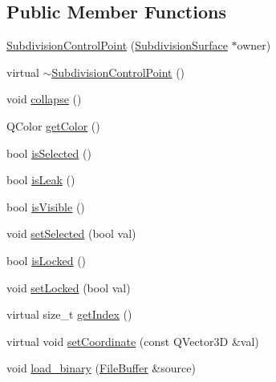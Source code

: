 \subsection*{Public Member Functions}
\begin{DoxyCompactItemize}
\item 
\hyperlink{classShipCADGeometry_1_1SubdivisionControlPoint_a812f4e2343926ef41bc7104f0f7b1dd9}{Subdivision\-Control\-Point} (\hyperlink{classShipCADGeometry_1_1SubdivisionSurface}{Subdivision\-Surface} $\ast$owner)
\item 
virtual \hyperlink{classShipCADGeometry_1_1SubdivisionControlPoint_aed35211e2f60cd5ed1de628d732e4791}{$\sim$\-Subdivision\-Control\-Point} ()
\item 
void \hyperlink{classShipCADGeometry_1_1SubdivisionControlPoint_a3c11cf5f0a22b44cbc8674a5d82942b0}{collapse} ()
\item 
Q\-Color \hyperlink{classShipCADGeometry_1_1SubdivisionControlPoint_ad3af0386e8bb679a2037054ddbdb6a20}{get\-Color} ()
\item 
bool \hyperlink{classShipCADGeometry_1_1SubdivisionControlPoint_af446fc02c7dc2e20383e741f71f4c358}{is\-Selected} ()
\item 
bool \hyperlink{classShipCADGeometry_1_1SubdivisionControlPoint_a1d9150cdde6105519de95a94689faa51}{is\-Leak} ()
\item 
bool \hyperlink{classShipCADGeometry_1_1SubdivisionControlPoint_ad739bf09eb693c8956101d0576736239}{is\-Visible} ()
\item 
void \hyperlink{classShipCADGeometry_1_1SubdivisionControlPoint_a5642f57c7f17e78c27ad6edb0fdb7f65}{set\-Selected} (bool val)
\item 
bool \hyperlink{classShipCADGeometry_1_1SubdivisionControlPoint_aaaa65fafa27eb876db3b1d5fc646aba8}{is\-Locked} ()
\item 
void \hyperlink{classShipCADGeometry_1_1SubdivisionControlPoint_a5f2cde3c54ca44c4b4d3ded0e3bc4ded}{set\-Locked} (bool val)
\item 
virtual size\-\_\-t \hyperlink{classShipCADGeometry_1_1SubdivisionControlPoint_a13c569f0894ba6193a3abf894bc4b517}{get\-Index} ()
\item 
virtual void \hyperlink{classShipCADGeometry_1_1SubdivisionControlPoint_a54a5233e02ef34a174c24d5dcf3c6407}{set\-Coordinate} (const Q\-Vector3\-D \&val)
\item 
void \hyperlink{classShipCADGeometry_1_1SubdivisionControlPoint_a989c801ca1c836ca73f77c68d719f546}{load\-\_\-binary} (\hyperlink{classShipCADGeometry_1_1FileBuffer}{File\-Buffer} \&source)

\end{DoxyCompactItemize}
